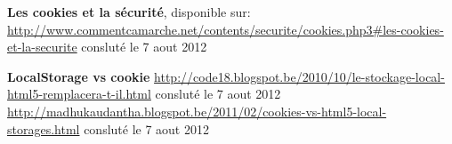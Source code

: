 \begin{thebibliography}{99}
\bibitem{}\textbf{Les cookies et la sécurité}, disponible sur: \newline
\url{http://www.commentcamarche.net/contents/securite/cookies.php3#les-cookies-et-la-securite} consluté le 7 aout 2012 

\bibitem{}\textbf{LocalStorage vs cookie} \newline
\url{http://code18.blogspot.be/2010/10/le-stockage-local-html5-remplacera-t-il.html} consluté le 7 aout 2012
\url{http://madhukaudantha.blogspot.be/2011/02/cookies-vs-html5-local-storages.html} consluté le 7 aout 2012

\end{thebibliography} 
